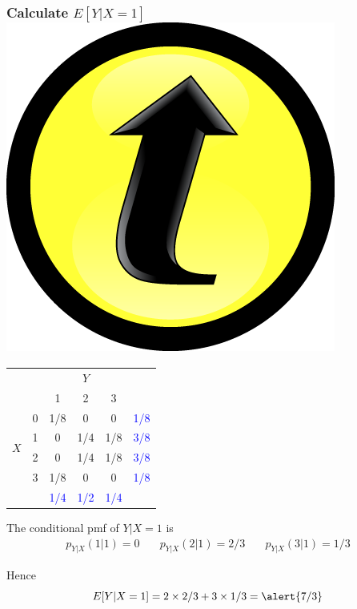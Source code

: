 \documentclass[handout]{beamer}
\begin{document}
\begin{frame}
	\frametitle{Calculate $E[Y|X=1]$ \hfill \includegraphics[scale = 0.05]{./images/clicker}}

\footnotesize
\begin{table}
\begin{tabular}{|cc|ccc|c|}
\hline
&&\multicolumn{3}{c|}{$Y$}&\\
&&1 & 2&3&\\
\hline
\multirow{4}{*}{$X$}
&0& \multicolumn{1}{|c}{\alert{1/8}} & \alert{0}& \alert{0}&\textcolor{blue}{1/8}\\
&1& \multicolumn{1}{|c}{\alert{0}} & \alert{1/4}&\alert{1/8}&\textcolor{blue}{3/8}\\
&2& \multicolumn{1}{|c}{\alert{0}} & \alert{1/4}&\alert{1/8}&\textcolor{blue}{3/8}\\
&3& \multicolumn{1}{|c}{\alert{1/8}} & \alert{0}&\alert{0}&\textcolor{blue}{1/8}\\
\hline
&&\textcolor{blue}{1/4}&\textcolor{blue}{1/2}&\textcolor{blue}{1/4}&\\
\hline
\end{tabular}
\end{table}
\pause
The conditional pmf of $Y|X=1$ is
	$$\boxed{\begin{array}{ccc}p_{Y|X}(1|1) =0 \quad&p_{Y|X}(2|1) =2/3 \quad&p_{Y|X}(3|1) =1/3\end{array}}$$
	

Hence
	$$E[Y|X=1] = 2 \times 2/3 + 3 \times 1/3 = \alert{7/3}$$

\end{frame}
\end{document}
